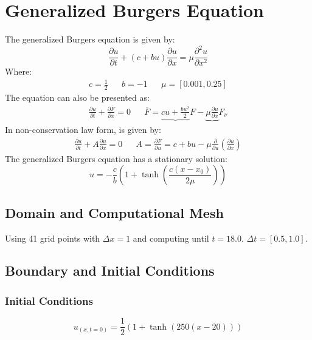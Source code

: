\documentclass[11pt, a4paper]{article}
\begin{document}
\section{Generalized Burgers Equation}
The generalized Burgers equation is given by:
\begin{equation}
    \frac{\partial u}{\partial t}+\left(c+bu\right)\frac{\partial u}{\partial x}=\mu\frac{\partial^2u}{\partial x^2}
\end{equation}
Where:
\begin{equation*}
    \begin{matrix}
        c=\frac{1}{2} && b=-1 && \mu=\left[0.001, 0.25\right]
    \end{matrix}
\end{equation*}
The equation can also be presented as:
\begin{equation}
    \begin{matrix}
        \displaystyle\frac{\partial u}{\partial t}+\frac{\partial\bar{F}}{\partial x}=0 && \bar{F}=\underbrace{cu+\frac{bu^2}{2}}F-\underbrace{\mu\frac{\partial u}{\partial x}}{F_\nu}
    \end{matrix}
\end{equation}
In non-conservation law form, is given by:
\begin{equation}
    \begin{matrix}
        \displaystyle\frac{\partial u}{\partial t}+A\frac{\partial u}{\partial x}=0 && \displaystyle A=\frac{\partial\bar{F}}{\partial u}=c+bu-\mu\frac{\partial}{\partial u}\left(\frac{\partial u}{\partial x}\right)
    \end{matrix}
\end{equation}
The generalized Burgers equation has a stationary solution:
\begin{equation}
    u=-\frac{c}{b}\left(1+\tanh{\left(\displaystyle\frac{c\left(x-x_0\right)}{2\mu}\right)}\right)
\end{equation}

\subsection{Domain and Computational Mesh}
Using 41 grid points with $\Delta x=1$ and computing until $t=18.0$. $\Delta t=\left[0.5, 1.0\right]$.

\subsection{Boundary and Initial Conditions}
\subsubsection{Initial Conditions}
\begin{equation}
    u_{\left(x,t=0\right)}=\frac{1}{2}\left(1+\tanh\left(250\left(x-20\right)\right)\right)
\end{equation}
\end{document}
